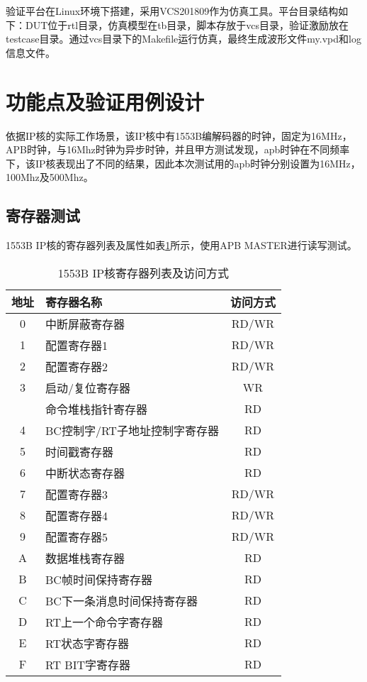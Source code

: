 \documentclass[fontset=windows]{article}
\begin{document}
验证平台在Linux环境下搭建，采用VCS201809作为仿真工具。平台目录结构如下：DUT位于rtl目录，仿真模型在tb目录，脚本存放于vcs目录，验证激励放在testcase目录。通过vcs目录下的Makefile运行仿真，最终生成波形文件my.vpd和log信息文件。

\section{功能点及验证用例设计}
依据IP核的实际工作场景，该IP核中有1553B编解码器的时钟，固定为16MHz，APB时钟，与16Mhz时钟为异步时钟，并且甲方测试发现，apb时钟在不同频率下，该IP核表现出了不同的结果，因此本次测试用的apb时钟分别设置为16MHz，100Mhz及500Mhz。
\subsection{寄存器测试}
1553B IP核的寄存器列表及属性如表\ref{tab:register-list}所示，使用APB MASTER进行读写测试。

\begin{table}[htbp]
    \centering
    \begin{tabular}{|c|l|c|}
        \hline
        地址 & 寄存器名称 & 访问方式 \\
        \hline
        0   & 中断屏蔽寄存器             & RD/WR \\
        1   & 配置寄存器1                & RD/WR \\
        2   & 配置寄存器2                & RD/WR \\
        3   & 启动/复位寄存器            & WR    \\
            & 命令堆栈指针寄存器         & RD    \\
        4   & BC控制字/RT子地址控制字寄存器 & RD \\
        5   & 时间戳寄存器               & RD    \\
        6   & 中断状态寄存器             & RD    \\
        7   & 配置寄存器3                & RD/WR \\
        8   & 配置寄存器4                & RD/WR \\
        9   & 配置寄存器5                & RD/WR \\
        A   & 数据堆栈寄存器             & RD    \\
        B   & BC帧时间保持寄存器         & RD    \\
        C   & BC下一条消息时间保持寄存器 & RD    \\
        D   & RT上一个命令字寄存器       & RD    \\
        E   & RT状态字寄存器             & RD    \\
        F   & RT BIT字寄存器             & RD    \\
        \hline
    \end{tabular}
    \caption{1553B IP核寄存器列表及访问方式}
    \label{tab:register-list}
\end{table}
\end{document}
